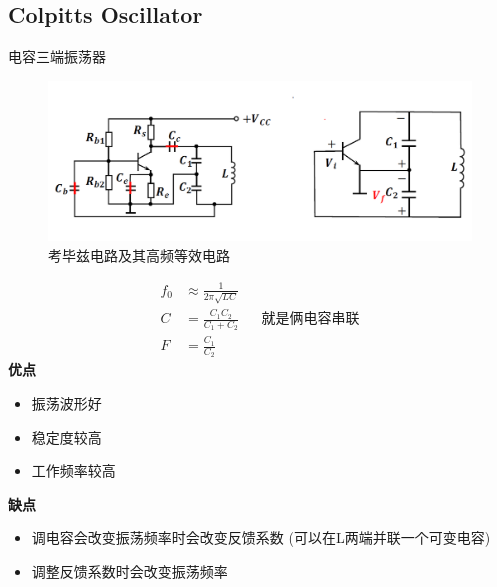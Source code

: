 \documentclass[a4paper]{report}
\begin{document}
\subsection{Colpitts Oscillator}
电容三端振荡器
\begin{figure}[H]
\centering
\includegraphics[width=1\textwidth]{osc_coplitts.png}
\caption{考毕兹电路及其高频等效电路}
\end{figure}
\begin{align*}
  f_0&\approx\frac{1}{2\pi\sqrt{LC}}\\
  C&=\frac{C_1 C_2}{C_1+C_2}&&\text{就是俩电容串联}\\
  F&=\frac{C_1}{C_2}
\end{align*}
\textbf{优点}
\begin{itemize}
  \item 振荡波形好
  \item 稳定度较高
  \item 工作频率较高
\end{itemize}
\textbf{缺点}
\begin{itemize}
  \item 调电容会改变振荡频率时会改变反馈系数 (可以在L两端并联一个可变电容)
  \item 调整反馈系数时会改变振荡频率
\end{itemize}
\end{document}
